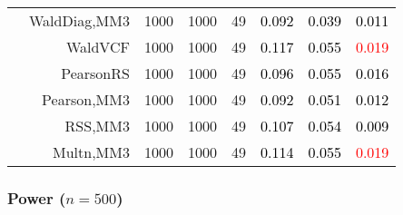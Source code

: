 \documentclass[
]{article}
\begin{document}
\begin{table}[H]
{\begin{tabular}[t]{lrrrrrrr}
\hspace{1em} & WaldDiag,MM3 & 1000 & 1000 & 49 & \textcolor{black}{0.092} & \textcolor{black}{0.039} & \textcolor{black}{0.011}\\

\hspace{1em} & WaldVCF & 1000 & 1000 & 49 & \textcolor{black}{0.117} & \textcolor{black}{0.055} & \textcolor{red}{0.019}\\

\hspace{1em} & PearsonRS & 1000 & 1000 & 49 & \textcolor{black}{0.096} & \textcolor{black}{0.055} & \textcolor{black}{0.016}\\

\hspace{1em} & Pearson,MM3 & 1000 & 1000 & 49 & \textcolor{black}{0.092} & \textcolor{black}{0.051} & \textcolor{black}{0.012}\\

\hspace{1em} & RSS,MM3 & 1000 & 1000 & 49 & \textcolor{black}{0.107} & \textcolor{black}{0.054} & \textcolor{black}{0.009}\\

\hspace{1em} & Multn,MM3 & 1000 & 1000 & 49 & \textcolor{black}{0.114} & \textcolor{black}{0.055} & \textcolor{red}{0.019}\\
\bottomrule
\end{tabular}}
\endgroup{}
\end{table}

\hypertarget{power-n500}{%
\subsubsection{\texorpdfstring{Power
(\(n=500\))}{Power (n=500)}}\label{power-n500}}
\end{document}
